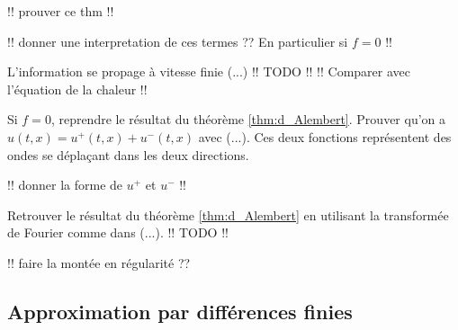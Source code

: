 \documentclass[12pt,a4paper,twoside]{article}
\begin{document}
!! prouver ce thm !!

!! donner une interpretation de ces termes ??
En particulier si $f=0$ !!

\begin{remark}
  L'information se propage \`a vitesse finie (...)
  !! TODO !! !! Comparer avec l'\'equation de la chaleur !!
\end{remark}

\begin{exercise}
  Si $f=0$, reprendre le r\'esultat du th\'eor\`eme \ref{thm:d_Alembert}.
  Prouver qu'on a $u(t,x) = u^+(t,x) + u^-(t,x)$
  avec (...).
  Ces deux fonctions repr\'esentent des ondes se d\'epla\c{c}ant
  dans les deux directions.

  !! donner la forme de $u^+$ et $u^-$ !!
\end{exercise}

\begin{exercise}
  Retrouver le r\'esultat du th\'eor\`eme \ref{thm:d_Alembert}
  en utilisant la transform\'ee de Fourier comme dans (...).
  !! TODO !!
\end{exercise}


!! faire la mont\'ee en r\'egularit\'e ??

\subsection{Approximation par diff\'erences finies}
\end{document}
